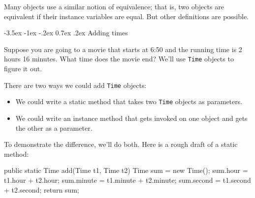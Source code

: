 \documentclass[12pt]{book}
\makeatletter
\theoremstyle{exercise}
\newcommand{\java}[1]{\verb"#1"}
\renewcommand{\section}{\@startsection{section}{1}{\z@}%
    {-3.5ex \@plus -1ex \@minus -.2ex}%
    {0.7ex \@plus.2ex}%
    {\normalfont\Large\bfseries}}
\newcommand{\java}[1]{\lstinline{#1}} %
\makeatother
\begin{document}


Many objects use a similar notion of equivalence; that is, two objects are equivalent if their instance variables are equal.
But other definitions are possible.


\section{Adding times}

Suppose you are going to a movie that starts at 6:50 and the running time is 2 hours 16 minutes.
What time does the movie end?
We'll use \java{Time} objects to figure it out.


There are two ways we could add \java{Time} objects:

\begin{itemize}

\item We could write a static method that takes two \java{Time} objects as parameters.

\item We could write an instance method that gets invoked on one object and gets the other as a parameter.

\end{itemize}

To demonstrate the difference, we'll do both.
Here is a rough draft of a static method:


\begin{code}
    public static Time add(Time t1, Time t2) {
        Time sum = new Time();
        sum.hour = t1.hour + t2.hour;
        sum.minute = t1.minute + t2.minute;
        sum.second = t1.second + t2.second;
        return sum;
    }
\end{code}
\end{document}
